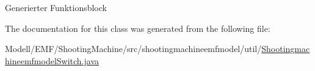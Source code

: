Generierter Funktionsblock 

The documentation for this class was generated from the following file\-:\begin{DoxyCompactItemize}
\item 
Modell/\-E\-M\-F/\-Shooting\-Machine/src/shootingmachineemfmodel/util/\hyperlink{_shootingmachineemfmodel_switch_8java}{Shootingmachineemfmodel\-Switch.\-java}\end{DoxyCompactItemize}
